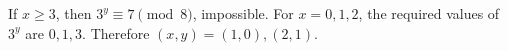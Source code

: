 If $x\ge3$, then $3^y\equiv7\pmod8$, impossible. For $x=0,1,2$, the required values of $3^y$ are $0,1,3$. Therefore $\boxed{(x,y)=(1,0),(2,1)}$.
